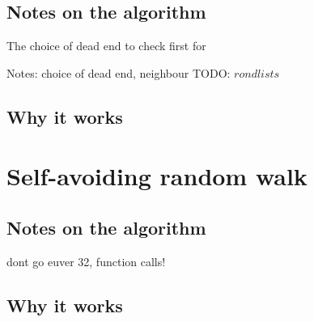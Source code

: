 \documentclass[10pt, a4paper, twoside]{amsart}
\newcommand{\1}{\mathbbm{1}}
\begin{document}
\subsection*{Notes on the algorithm}
The choice of dead end to check first for 

Notes: choice of dead end, neighbour 
TODO: $rond lists$

\subsection{Why it works}

\section{Self-avoiding random walk}


\subsection*{Notes on the algorithm}
dont go euver 32, function calls!

\subsection{Why it works}
\end{document}
